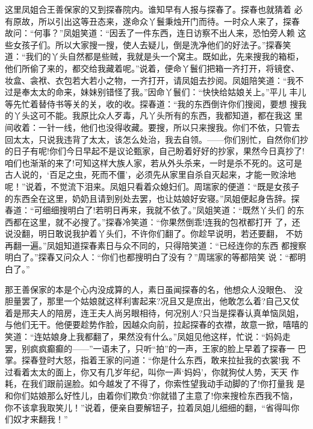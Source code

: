 这里凤姐合王善保家的又到探春院内。谁知早有人报与探春了。探春也就猜着
必有原故，所以引出这等丑态来，遂命众丫鬟秉烛开门而待。一时众人来了，探春
故问：“何事？”凤姐笑道：“因丢了一件东西，连日访察不出人来，恐怕旁人赖
这些女孩子们。所以大家搜一搜，使人去疑儿，倒是洗净他们的好法子。”探春笑
道：“我们的丫头自然都是些贼，我就是头一个窝主。既如此，先来搜我的箱柜，
他们所偷了来的，都交给我藏着呢。”说着，便命丫鬟们把箱一齐打开，将镜奁、
妆盒、衾袱、衣包若大若小之物，一齐打开，请凤姐去抄阅。凤姐陪笑道：“我不
过是奉太太的命来，妹妹别错怪了我。”因命丫鬟们：“快快给姑娘关上。”平儿
丰儿等先忙着替侍书等关的关，收的收。探春道：“我的东西倒许你们搜阅，要想
搜我的丫头这可不能。我原比众人歹毒，凡丫头所有的东西，我都知道，都在我这
里间收着：一针一线，他们也没得收藏。要搜，所以只来搜我。你们不依，只管去
回太太，只说我违背了太太，该怎么处治，我去自领。——你们别忙，自然你们抄
的日子有呢!你们今日早起不是议论甄家，自己盼着好好的抄家，果然今日真抄了!
咱们也渐渐的来了!可知这样大族人家，若从外头杀来，一时是杀不死的。这可是
古人说的，‘百足之虫，死而不僵’，必须先从家里自杀自灭起来，才能一败涂地
呢！”说着，不觉流下泪来。凤姐只看着众媳妇们。周瑞家的便道：“既是女孩子
的东西全在这里，奶奶且请到别处去罢，也让姑娘好安寝。”凤姐便起身告辞。探
春道：“可细细搜明白了!若明日再来，我就不依了。”凤姐笑道：“既然丫头们
的东西都在这里，就不必搜了。”探春冷笑道：“你果然倒乖!连我的包袱都打开
了，还说没翻，明日敢说我护着丫头们，不许你们翻了。你趁早说明，若还要翻，
不妨再翻一遍。”凤姐知道探春素日与众不同的，只得陪笑道：“已经连你的东西
都搜察明白了。”探春又问众人：“你们也都搜明白了没有？”周瑞家的等都陪笑
说：“都明白了。”

那王善保家的本是个心内没成算的人，素日虽闻探春的名，他想众人没眼色、
没胆量罢了，那里一个姑娘就这样利害起来?况且又是庶出，他敢怎么着?自己又仗
着是邢夫人的陪房，连王夫人尚另眼相待，何况别人?只当是探春认真单恼凤姐，
与他们无干。他便要趁势作脸，因越众向前，拉起探春的衣襟，故意一掀，嘻嘻的
笑道：“连姑娘身上我都翻了，果然没有什么。”凤姐见他这样，忙说：“妈妈走
罢，别疯疯癫癫的——”一语未了，只听“拍”的一声，王家的脸上早着了探春一
巴掌。探春登时大怒，指着王家的问道：“你是什么东西，敢来拉扯我的衣裳!我
不过看着太太的面上，你又有几岁年纪，叫你一声‘妈妈’，你就狗仗人势，天天
作耗，在我们跟前逞脸。如今越发了不得了，你索性望我动手动脚的了!你打量我
是和你们姑娘那么好性儿，由着你们欺负?你就错了主意了!你来搜检东西我不恼，
你不该拿我取笑儿！”说着，便亲自要解钮子，拉着凤姐儿细细的翻，“省得叫你
们奴才来翻我！”

